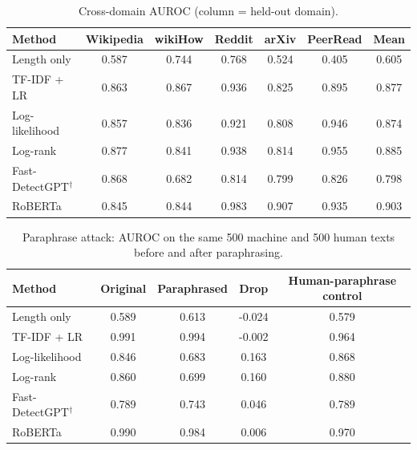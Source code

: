 \documentclass{nle}
\begin{document}
\begin{table}
  \caption{Cross-domain AUROC (column = held-out domain).}
  \begin{tabular}{lcccccc}
  \hline\hline
  Method & Wikipedia & wikiHow & Reddit & arXiv & PeerRead & Mean \\
  \hline
  Length only                & 0.587 & 0.744 & 0.768 & 0.524 & 0.405 & 0.605 \\
  TF-IDF + LR                & 0.863 & 0.867 & 0.936 & 0.825 & 0.895 & 0.877 \\
  Log-likelihood             & 0.857 & 0.836 & 0.921 & 0.808 & 0.946 & 0.874 \\
  Log-rank                   & 0.877 & 0.841 & 0.938 & 0.814 & 0.955 & 0.885 \\
  Fast-DetectGPT$^\dagger$   & 0.868 & 0.682 & 0.814 & 0.799 & 0.826 & 0.798 \\
  RoBERTa                    & 0.845 & 0.844 & 0.983 & 0.907 & 0.935 & 0.903 \\
  \hline\hline
  \end{tabular}
  \label{tab:xdomain}
\end{table}

\begin{table}
  \caption{Paraphrase attack: AUROC on the same 500 machine and 500 human texts before and after paraphrasing.}
  \begin{tabular}{lcccc}
  \hline\hline
  Method & Original & Paraphrased & Drop & Human-paraphrase control \\
  \hline
  Length only                & 0.589 & 0.613 & -0.024 & 0.579 \\
  TF-IDF + LR                & 0.991 & 0.994 & -0.002 & 0.964 \\
  Log-likelihood             & 0.846 & 0.683 & 0.163 & 0.868 \\
  Log-rank                   & 0.860 & 0.699 & 0.160 & 0.880 \\
  Fast-DetectGPT$^\dagger$   & 0.789 & 0.743 & 0.046 & 0.789 \\
  RoBERTa                    & 0.990 & 0.984 & 0.006 & 0.970 \\
  \hline\hline
  \end{tabular}
  \label{tab:para}
\end{table}
\end{document}

